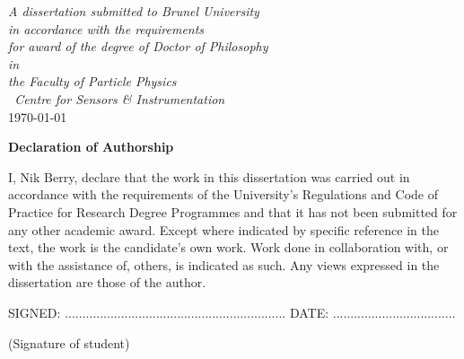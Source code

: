 \documentclass[oneside, a4paper, 11pt, ]{report}
\begin{document}
\begin{titlepage}
\begin{center}
\large \textit{ A dissertation submitted to Brunel University\\ in accordance with the requirements\\ for award of the degree of Doctor of Philosophy}\\[0.3cm] 
\textit{in}\\[0.4cm]
\textit{the Faculty of Particle Physics\\\ Centre for Sensors \& Instrumentation} \\

\vspace*{6mm}
{\large \today}\\[4cm]

\end{center}

\end{titlepage}

\pagestyle{empty}


\newpage

\begin{declaration}
\begin{center}
 \begin{large}
\textbf{Declaration of Authorship}
\end{large}
\end{center}

\noindent I, Nik Berry, declare that the work in this dissertation was carried out in accordance with the requirements of the University's Regulations and Code of Practice for Research Degree Programmes and that it has not been submitted for any other academic award. Except where indicated by specific reference in the text, the work is the candidate's own work. Work done in collaboration with, or with the assistance of, others, is indicated as such. Any views expressed in the dissertation are those of the author.\\

\begin{center}
SIGNED: $...............................................................$  DATE: $...................................$

(Signature of student)

\vspace{12pt}
\end{center}
\null\vfill
\end{declaration}
\end{document}
